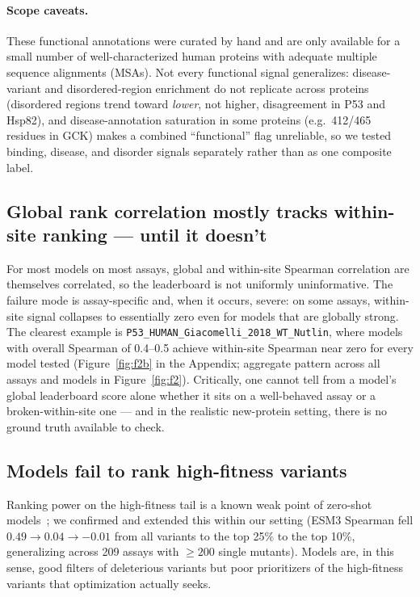\documentclass{article}
\begin{document}
\paragraph{Scope caveats.} These functional annotations were curated by hand and are only available for a small number of well-characterized human proteins with adequate multiple sequence alignments (MSAs). Not every functional signal generalizes: disease-variant and disordered-region enrichment do not replicate across proteins (disordered regions trend toward \emph{lower}, not higher, disagreement in P53 and Hsp82), and disease-annotation saturation in some proteins (e.g.\ 412/465 residues in GCK) makes a combined ``functional'' flag unreliable, so we tested binding, disease, and disorder signals separately rather than as one composite label.

\subsection{Global rank correlation mostly tracks within-site ranking --- until it doesn't}
\label{sec:global-vs-withinsite}

For most models on most assays, global and within-site Spearman correlation are themselves correlated, so the leaderboard is not uniformly uninformative. The failure mode is assay-specific and, when it occurs, severe: on some assays, within-site signal collapses to essentially zero even for models that are globally strong. The clearest example is \texttt{P53\_HUMAN\_Giacomelli\_2018\_WT\_Nutlin}, where models with overall Spearman of 0.4--0.5 achieve within-site Spearman near zero for every model tested (Figure~\ref{fig:f2b} in the Appendix; aggregate pattern across all assays and models in Figure~\ref{fig:f2}). Critically, one cannot tell from a model's global leaderboard score alone whether it sits on a well-behaved assay or a broken-within-site one --- and in the realistic new-protein setting, there is no ground truth available to check.

\subsection{Models fail to rank high-fitness variants}
\label{sec:high-fitness}

Ranking power on the high-fitness tail is a known weak point of zero-shot models~\citep{woolley_overestimating_2026}; we confirmed and extended this within our setting (ESM3 Spearman fell $0.49\rightarrow0.04\rightarrow-0.01$ from all variants to the top 25\% to the top 10\%, generalizing across 209 assays with $\geq 200$ single mutants). Models are, in this sense, good filters of deleterious variants but poor prioritizers of the high-fitness variants that optimization actually seeks.
\end{document}
